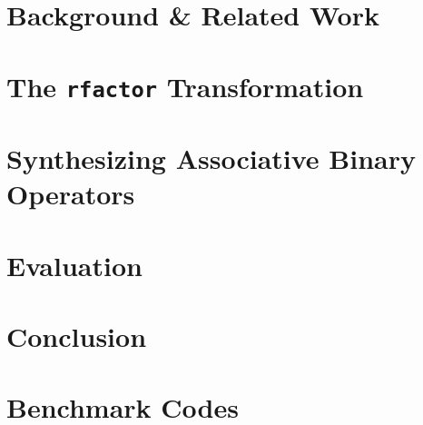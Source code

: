 \documentclass[10pt,numbers]{sigplanconf}
\newcommand{\code}[1]{\texttt{#1}}
\begin{document}
\vspace*{-5pt}
\section{Background \& Related Work}
\label{background}


\section{The \code{rfactor} Transformation}
\label{assoc_red}


\section{Synthesizing Associative Binary Operators}
\label{synthesize}


\section{Evaluation}
\label{evaluation}


\section{Conclusion}
\label{conclusion}



%
%

\appendix
\section*{Benchmark Codes}

\end{document}
